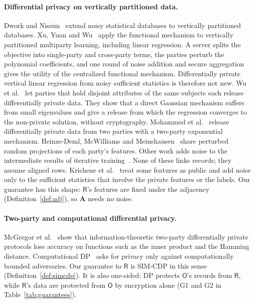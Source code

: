 \documentclass[11pt]{article}
\theoremstyle{definition}
\theoremstyle{plain}
\newcommand{\bA}{\mathbf{A}}
\newcommand{\Party}[1]{\textsf{#1}}
\newcommand{\Rp}{\Party{R}}
\newcommand{\Op}{\Party{O}}
\begin{document}
\paragraph{Differential privacy on vertically partitioned data.} Dwork and Nissim~\cite{dwork2004privacy} extend noisy statistical databases to vertically partitioned databases. Xu, Yuan and Wu~\cite{xu2019achieving} apply the functional mechanism to vertically partitioned multiparty learning, including linear regression. A server splits the objective into single-party and cross-party terms, the parties perturb the polynomial coefficients, and one round of noise addition and secure aggregation gives the utility of the centralized functional mechanism. Differentially private vertical linear regression from noisy sufficient statistics is therefore not new. Wu et al.~\cite{wu2022differentially} let parties that hold disjoint attributes of the same subjects each release differentially private data. They show that a direct Gaussian mechanism suffers from small eigenvalues and give a release from which the regression converges to the non-private solution, without cryptography. Mohammed et al.~\cite{mohammed2014secure} release differentially private data from two parties with a two-party exponential mechanism. Heinze-Deml, McWilliams and Meinshausen~\cite{heinzedeml2017preserving} share perturbed random projections of each party's features. Other work adds noise to the intermediate results of iterative training~\cite{wang2020hybrid,dejong2022differentially}. None of these links records; they assume aligned rows. Krichene et al.~\cite{krichene2024private} treat some features as public and add noise only to the sufficient statistics that involve the private features or the labels. Our guarantee has this shape: $\Rp$'s features are fixed under the adjacency (Definition~\ref{def:adj}), so $\bA$ needs no noise.

\paragraph{Two-party and computational differential privacy.} McGregor et al.~\cite{mcgregor2010limits} show that information-theoretic two-party differentially private protocols lose accuracy on functions such as the inner product and the Hamming distance. Computational DP~\cite{mironov2009computational} asks for privacy only against computationally bounded adversaries. Our guarantee to $\Rp$ is SIM-CDP in this sense (Definition~\ref{def:simcdp}). It is also one-sided: DP protects $\Op$'s records from $\Rp$, while $\Rp$'s data are protected from $\Op$ by encryption alone (G1 and G2 in Table~\ref{tab:guarantees}).
\end{document}
